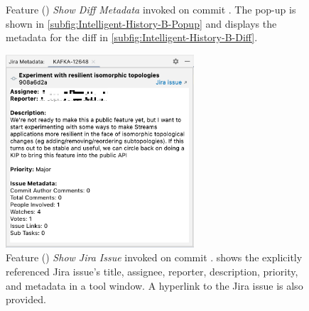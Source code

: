 \begin{figure}
    \centering
    \qquad
    \caption{
        Feature () \textit{Show Diff Metadata} invoked on commit . 
        The pop-up is shown in \autoref{subfig:Intelligent-History-B-Popup} 
        and displays the metadata for the diff in \autoref{subfig:Intelligent-History-B-Diff}.
    }
    \label{fig:Intelligent-History-B}%
\end{figure}

\begin{figure}
    \centering
    \includegraphics[width=7cm]{./images/intelligent-history-C.png}
    \caption{
        Feature () \textit{Show Jira Issue} invoked on commit .
         shows the explicitly referenced Jira issue's title, assignee, reporter, description, priority, 
        and metadata in a tool window. A hyperlink to the Jira issue is also provided.
    }
    \label{fig:Intelligent-History-C}
\end{figure}

